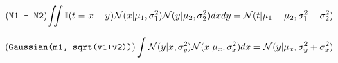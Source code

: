 \documentclass[article]{jss}
\newif\ifen
\newif\ifes
\newcommand{\en}[1]{\ifen#1\fi}
\newcommand{\es}[1]{\ifes#1\fi}
\newcommand{\N}{\mathcal{N}}
\begin{document}
%
\vspace{-0.5cm}
%
\begin{equation} \tag{\texttt{N1 - N2}} \label{eq:resta_normales}
\begin{split}
\iint \mathbb{I}(t = x - y) \N(x|\mu_1, \sigma_1^2)\N(y|\mu_2, \sigma_2^2) dxdy = \N(t|\mu_1 - \mu_2,\sigma_1^2 + \sigma_2^2)
\end{split}
\end{equation}
%
\en{For its part, the following property will be computed ``by hand''.}
\es{Por su parte, la siguiente propiedad la computaremos ``a mano''.}
%
\begin{equation} \label{eq:normal_de_normal} \tag{\texttt{Gaussian(m1, sqrt(v1+v2))}}
\int \N(y| x, \sigma_y^2) \N(x| \mu_x, \sigma_x^2) dx = \N(y|\mu_x,\sigma_y^2 + \sigma_x^2)   
\end{equation}
%
\en{Note that the value of \texttt{m1},\texttt{v1},\texttt{v2} has been previously defined.}
\es{Notar que el valor de \texttt{m1},\texttt{v1},\texttt{v2} a sido definido previamente.}


\subsection{\en{Graphical factorization}}\label{sec:2vs2}
\end{document}
